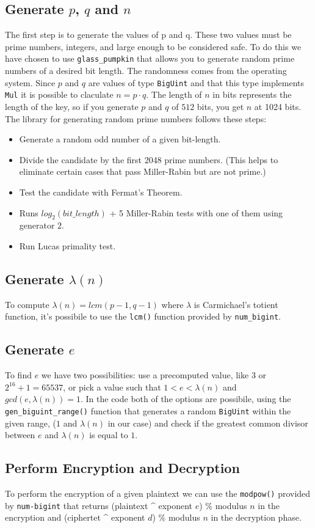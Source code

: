 \documentclass[11pt]{article}
\begin{document}
\subsection{Generate $p$, $q$ and $n$}
The first step is to generate the values of p and q. These two values must be prime numbers, integers, and large enough to be considered safe.
To do this we have chosen to use \Verb"glass_pumpkin" that allows you to generate random prime numbers of a
desired bit length. The randomness comes from the operating system.
Since $p$ and $q$ are values of type \Verb"BigUint" and that this type implements \Verb"Mul" \cite{mul}
it is possible to claculate $n = p \cdot q$.
The length of $n$ in bits represents the length of the key, so if you generate $p$ and $q$ of $512$ bits, you get $n$ at 1024 bits.
The library for generating random prime numbers follows these steps:
\begin{itemize}
  \item Generate a random odd number of a given bit-length.
  \item Divide the candidate by the first 2048 prime numbers. (This helps to eliminate certain cases that pass Miller-Rabin but are not prime.)
  \item Test the candidate with Fermat's Theorem.
  \item Runs $log_2(bit\_length)$ + 5 Miller-Rabin tests with one of them using generator $2$.
  \item Run Lucas primality test.
\end{itemize}
\subsection{Generate $\lambda(n)$}
To compute $\lambda(n) = lcm(p - 1, q - 1)$ where $\lambda$ is Carmichael's totient function, it's possibile to use the \Verb"lcm()" function
provided by \Verb"num_bigint".
\subsection{Generate $e$}
To find $e$ we have two possibilities: use a precomputed value, like $3$ or $ 2^{16} + 1 = 65537$, or
pick a value such that $1 < e < \lambda(n)$ and $gcd(e, \lambda(n)) = 1$. In the code both of the options
are possibile, using the \Verb"gen_biguint_range()" function that generates a random \Verb"BigUint" within the given range, ($1$ and $\lambda(n)$ in our case)
and check if the greatest common divisor between $e$ and $\lambda(n)$ is equal to $1$.
\subsection{Perform Encryption and Decryption}
To perform the encryption of a given plaintext we can use the \Verb"modpow()" provided by \Verb"num-bigint" that returns
(plaintext \^{} exponent $e$) \% modulus $n$ in the encryption
and (ciphertet \^{} exponent $d$) \% modulus $n$ in the decryption phase.
\end{document}
